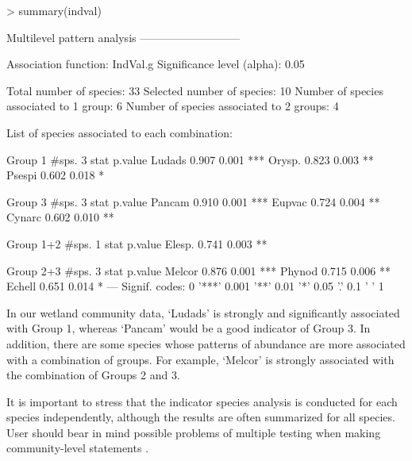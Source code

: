 \documentclass[11pt,a4paper]{article}
\begin{document}
\begin{Schunk}
\begin{Sinput}
> summary(indval) 
\end{Sinput}
\begin{Soutput}
 Multilevel pattern analysis
 ---------------------------

 Association function: IndVal.g
 Significance level (alpha): 0.05

 Total number of species: 33
 Selected number of species: 10 
 Number of species associated to 1 group: 6 
 Number of species associated to 2 groups: 4 

 List of species associated to each combination: 

 Group 1  #sps.  3 
        stat p.value    
Ludads 0.907   0.001 ***
Orysp. 0.823   0.003 ** 
Psespi 0.602   0.018 *  

 Group 3  #sps.  3 
        stat p.value    
Pancam 0.910   0.001 ***
Eupvac 0.724   0.004 ** 
Cynarc 0.602   0.010 ** 

 Group 1+2  #sps.  1 
        stat p.value   
Elesp. 0.741   0.003 **

 Group 2+3  #sps.  3 
        stat p.value    
Melcor 0.876   0.001 ***
Phynod 0.715   0.006 ** 
Echell 0.651   0.014 *  
---
Signif. codes:  0 '***' 0.001 '**' 0.01 '*' 0.05 '.' 0.1 ' ' 1 
\end{Soutput}
\end{Schunk}
In our wetland community data, `Ludads' is strongly and significantly associated with Group 1, whereas `Pancam' would be a good indicator of Group 3. In addition, there are some species whose patterns of abundance are more associated with a combination of groups. For example, `Melcor' is strongly associated with the combination of Groups 2 and 3.

It is important to stress that the indicator species analysis is conducted for each species independently, although the results are often summarized for all species. User should bear in mind possible problems of multiple testing when making community-level statements \citep{DeCaceres2009}\citep{Legendre2012}.
\end{document}
